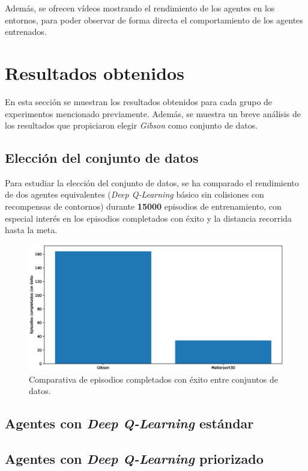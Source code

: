 Además, se ofrecen vídeos mostrando el rendimiento de los agentes en los entornos, para poder observar de forma directa el comportamiento de los agentes entrenados.

\section{Resultados obtenidos}

En esta sección se muestran los resultados obtenidos para cada grupo de experimentos mencionado previamente. Además, se muestra un breve análisis de los resultados que propiciaron elegir \textit{Gibson} como conjunto de datos.

\subsection{Elección del conjunto de datos}

Para estudiar la elección del conjunto de datos, se ha comparado el rendimiento de dos agentes equivalentes (\textit{Deep Q-Learning} básico sin colisiones con recompensas de contornos) durante \textbf{15000} episodios de entrenamiento, con especial interés en los episodios completados con éxito y la distancia recorrida hasta la meta.

\begin{figure}[h]
    \centering
    \includegraphics[width=\textwidth]{imagenes/cap6/dataset/success.eps}
    \caption{Comparativa de episodios completados con éxito entre conjuntos de datos.}
    \label{fig:chap6-dataset-success}
\end{figure}

\subsection{Agentes con \textit{Deep Q-Learning} estándar}

\subsection{Agentes con \textit{Deep Q-Learning} priorizado}

